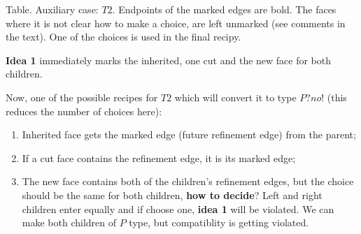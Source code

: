 \documentclass[a4paper,12pt]{amsart}
\numberwithin{equation}{section}
\begin{document}
\begin{itemize}
\begin{minipage}[]{0.5\textwidth}
\begin{center}
  \end{center}
\end{minipage}    

\begin{center}
	Table. Auxiliary case: $T2$. Endpoints of the marked edges are bold. The faces where it is not clear how to make a choice, are left unmarked (see comments in the text). One of the choices is used in the final recipy.
\end{center}    
    
    \textbf{Idea 1} immediately marks the inherited, one cut and the new face for both children. 
    
    Now, one of the possible recipes for $T2$ which will convert it to type $P? no!$ (this reduces the number of choices here):
    	\begin{enumerate}
		\item Inherited face gets the marked edge (future refinement edge) from the parent;
		\item If a cut face contains the refinement edge, it is its marked edge;
		\item The new face contains both of the children's refinement edges, but the choice should be the same for both children, \textbf{how to decide}? Left and right children enter equally and if choose one, \textbf{idea 1} will be violated. We can make both children of $P$ type, but compatiblity is getting violated.
		\end{enumerate}	
		

\end{itemize}
\end{document}
